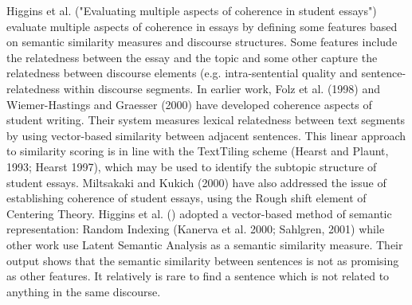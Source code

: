 Higgins et al. ("Evaluating multiple aspects of coherence in student essays") evaluate multiple aspects of coherence in essays by defining some features based on semantic similarity measures and discourse structures. 
Some features include the relatedness between the essay and the topic and some other capture the relatedness between discourse elements (e.g. intra-sentential quality and sentence-relatedness within discourse segments. 
In earlier work, Folz et al. (1998) and Wiemer-Hastings and Graesser (2000) have developed coherence aspects of student writing.
Their system measures lexical relatedness between text segments by using vector-based similarity between adjacent sentences.
This linear approach to similarity scoring is in line with the TextTiling scheme (Hearst and Plaunt, 1993; Hearst 1997), which may be used to identify the subtopic structure of student essays. 
Miltsakaki and Kukich (2000) have also addressed the issue of establishing coherence of student essays, using the Rough shift element of Centering Theory. 
Higgins et al. () adopted a vector-based method of semantic representation: Random Indexing (Kanerva et al. 2000; Sahlgren, 2001) while other work use Latent Semantic Analysis as a semantic similarity measure. 
Their output shows that the semantic similarity between sentences is not as promising as other features. 
It relatively is rare to find a sentence which is not related to anything in the same discourse. 

